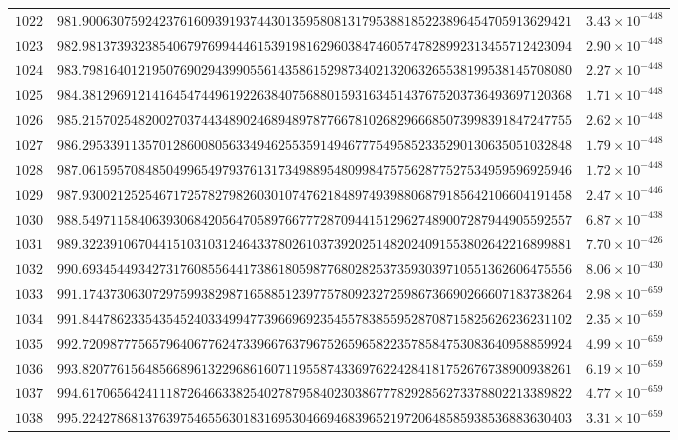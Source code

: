 \documentclass[12pt,reqno]{amsart}
\theoremstyle{remark}
\begin{document}
\begin{longtable}{clc}
$1022$ & $981.9006307592423761609391937443013595808131795388185223896454705913629421$ & $3.43\times 10^{-448}$ \\
$1023$ & $982.9813739323854067976994446153919816296038474605747828992313455712423094$ & $2.90\times 10^{-448}$ \\
$1024$ & $983.7981640121950769029439905561435861529873402132063265538199538145708080$ & $2.27\times 10^{-448}$ \\
$1025$ & $984.3812969121416454744961922638407568801593163451437675203736493697120368$ & $1.71\times 10^{-448}$ \\
$1026$ & $985.2157025482002703744348902468948978776678102682966685073998391847247755$ & $2.62\times 10^{-448}$ \\
$1027$ & $986.2953391135701286008056334946255359149467775495852335290130635051032848$ & $1.79\times 10^{-448}$ \\
$1028$ & $987.0615957084850499654979376131734988954809984757562877527534959596925946$ & $1.72\times 10^{-448}$ \\
$1029$ & $987.9300212525467172578279826030107476218489749398806879185642106604191458$ & $2.47\times 10^{-446}$ \\
$1030$ & $988.5497115840639306842056470589766777287094415129627489007287944905592557$ & $6.87\times 10^{-438}$ \\
$1031$ & $989.3223910670441510310312464337802610373920251482024091553802642216899881$ & $7.70\times 10^{-426}$ \\
$1032$ & $990.6934544934273176085564417386180598776802825373593039710551362606475556$ & $8.06\times 10^{-430}$ \\
$1033$ & $991.1743730630729759938298716588512397757809232725986736690266607183738264$ & $2.98\times 10^{-659}$ \\
$1034$ & $991.8447862335435452403349947739669692354557838559528708715825626236231102$ & $2.35\times 10^{-659}$ \\
$1035$ & $992.7209877756579640677624733966763796752659658223578584753083640958859924$ & $4.99\times 10^{-659}$ \\
$1036$ & $993.8207761564856689613229686160711955874336976224284181752676738900938261$ & $6.19\times 10^{-659}$ \\
$1037$ & $994.6170656424111872646633825402787958402303867778292856273378802213389822$ & $4.77\times 10^{-659}$ \\
$1038$ & $995.2242786813763975465563018316953046694683965219720648585938536883630403$ & $3.31\times 10^{-659}$ \\

\end{longtable}
\end{document}
